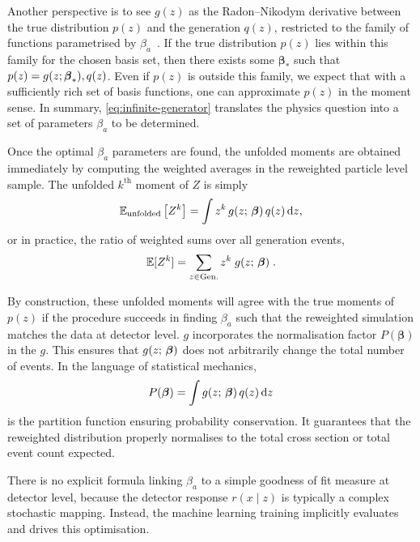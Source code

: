{{        Another perspective is to see $g(z)$ as the Radon--Nikodym derivative between the true distribution $p(z)$ and the generation $q(z)$, restricted to the family of functions parametrised by $\beta_a$~\cite{NikodymSurRadon, radon_theorie_1913}.
        If the true distribution $p(z)$ lies within this family for the chosen basis set, then there exists some $\boldsymbol{\beta}_*$ such that $p(z) = g(z; \vb*{\beta}_*),q(z)$.
        Even if $p(z)$ is outside this family, we expect that with a sufficiently rich set of basis functions, one can approximate $p(z)$ in the moment sense.
        In summary, \cref{eq:infinite-generator} translates the physics question into a set of parameters $\beta_a$ to be determined.

        Once the optimal $\beta_a$ parameters are found, the unfolded moments are obtained immediately by computing the weighted averages in the reweighted particle level sample.
        The unfolded $k^\text{th}$ moment of $Z$ is simply
        \[
            \operatorname{\mathbb{E}}_{\text{unfolded}}\qty[Z^k] = \int z^k\,g(z;\,\vb*\beta)\,q(z)\,\dd z ,
        \]
        or in practice, the ratio of weighted sums over all generation events,
        \[
            \operatorname{\mathbb{E}}[Z^k] = \sum_{z\in \text{Gen.}} z^k\;g(z;\, \vb*\beta)\;.
        \]
        
        By construction, these unfolded moments will agree with the true moments of $p(z)$ if the procedure succeeds in finding $\beta_a$ such that the reweighted simulation matches the data at detector level.
        \(g\) incorporates the normalisation factor $P(\boldsymbol{\beta})$ in the \(g\).
        This ensures that $g(z;\,\vb*\beta)$ does not arbitrarily change the total number of events.
        In the language of statistical mechanics,
        \[
            P(\boldsymbol{\beta})  = \int g(z;\,\vb*\beta)\,q(z)\,\dd z
        \]
        is the partition function ensuring probability conservation.
        It guarantees that the reweighted distribution properly normalises to the total cross section or total event count expected.
        
        There is no explicit formula linking $\beta_a$ to a simple goodness of fit measure at detector level, because the detector response $r(x\mid z)$ is typically a complex stochastic mapping.
        Instead, the machine learning training implicitly evaluates and drives this optimisation.
        
}}
